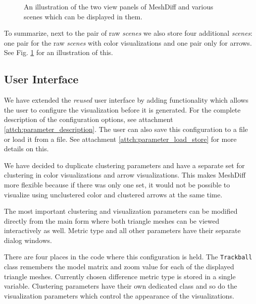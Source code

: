 \begin{figure}[h]
	\centering
	\def\svgwidth{\textwidth}
	
	\caption[Scenes Explained]{An illustration of the two view panels of MeshDiff and various scenes which can be displayed in them.}
	\label{fig:illustration-scenes_explained}
\end{figure}

To summarize, next to the pair of raw {\it scenes} we also store four additional {\it scenes}: one pair for the raw {\it scenes} with color visualizations and one pair only for arrows. See Fig. \ref{fig:illustration-scenes_explained} for an illustration of this.

\subsection{User Interface}
\label{subsec:implementation-architecture-user_interface}

We have extended the {\it reused} user interface by adding functionality which allows the user to configure the visualization before it is generated. For the complete description of the configuration options, see attachment \ref{attch:parameter_description}. The user can also save this configuration to a file or load it from a file. See attachment \ref{attch:parameter_load_store} for more details on this.

We have decided to duplicate clustering parameters and have a separate set for clustering in color visualizations and arrow visualizations. This makes MeshDiff more flexible because if there was only one set, it would not be possible to visualize using unclustered color and clustered arrows at the same time.

The most important clustering and visualization parameters can be modified directly from the main form where both triangle meshes can be viewed interactively as well. Metric type and all other parameters have their separate dialog windows.

There are four places in the code where this configuration is held. The \verb+Trackball+ class remembers the model matrix and zoom value for each of the displayed triangle meshes. Currently chosen difference metric type is stored in a single variable. Clustering parameters have their own dedicated class and so do the visualization parameters which control the appearance of the visualizations.


